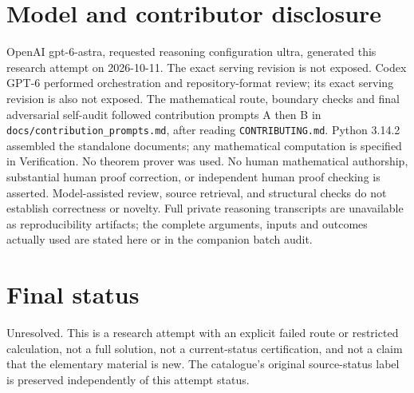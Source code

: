 \documentclass[11pt,a4paper]{article}
\begin{document}
\section{Model and contributor disclosure}
OpenAI gpt-6-astra, requested reasoning configuration ultra, generated this research
attempt on 2026-10-11. The exact serving revision is not exposed. Codex GPT-6
performed orchestration and repository-format review; its exact serving revision
is also not exposed. The mathematical route, boundary checks and final adversarial
self-audit followed contribution prompts A then B in
\texttt{docs/contribution\_prompts.md}, after reading \texttt{CONTRIBUTING.md}.
Python 3.14.2 assembled the standalone documents; any mathematical computation is
specified in Verification. No theorem prover was used. No human mathematical
authorship, substantial human proof correction, or independent human proof checking
is asserted. Model-assisted review, source retrieval, and structural checks do not
establish correctness or novelty. Full private reasoning transcripts are unavailable
as reproducibility artifacts; the complete arguments, inputs and outcomes actually
used are stated here or in the companion batch audit.
\section{Final status}
Unresolved. This is a research attempt with an explicit failed route or restricted
calculation, not a full solution, not a current-status certification, and not a claim
that the elementary material is new. The catalogue's original source-status label
is preserved independently of this attempt status.
\end{document}
